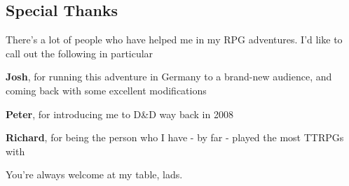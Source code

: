 \subsection {Special Thanks}

There's a lot of people who have helped me in my RPG adventures. I'd like to call out the following in particular

\textbf{Josh}, for running this adventure in Germany to a brand-new audience, and coming back with some excellent modifications

\textbf{Peter}, for introducing me to D\&D way back in 2008

\textbf{Richard}, for being the person who I have - by far - played the most TTRPGs with

You're always welcome at my table, lads.

